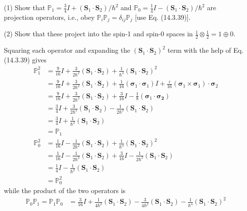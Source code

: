 \documentclass[../principles-of-quantum-mechanics.tex]{subfiles}
\begin{document}
\begin{questions}
		\question (1) Show that $\mathbb{P}_1 = \tfrac{3}{4}I + (\mathbf{S}_1\cdot\mathbf{S}_2)/\hbar^2$ and $\mathbb{P}_0 = \tfrac{1}{4}I - (\mathbf{S}_1\cdot\mathbf{S}_2)/\hbar^2$ are projection operators, i.e., obey $\mathbb{P}_i\mathbb{P}_j = \delta_{ij}\mathbb{P}_j$ [use Eq. (14.3.39)].
		
		(2) Show that these project into the spin-1 and spin-0 spaces in $\tfrac{1}{2}\otimes\tfrac{1}{2}=1\oplus0$.
		
		\begin{solution}
			Squaring each operator and expanding the $(\mathbf{S}_1\cdot\mathbf{S}_2)^2$ term with the help of Eq. (14.3.39) gives
			\begin{align*}
				\mathbb{P}_1^2 &= \frac{9}{16}I + \frac{3}{2\hbar^2}(\mathbf{S}_1\cdot\mathbf{S}_2) + \frac{1}{\hbar^4}(\mathbf{S}_1\cdot\mathbf{S}_2)^2 \\
				&= \frac{9}{16}I + \frac{3}{2\hbar^2}(\mathbf{S}_1\cdot\mathbf{S}_2) + \frac{1}{16}(\boldsymbol{\sigma}_1\cdot\boldsymbol{\sigma}_1) I + \frac{i}{16}(\boldsymbol{\sigma}_1\times\boldsymbol{\sigma}_1)\cdot\boldsymbol{\sigma}_2 \\
				&= \frac{9}{16}I + \frac{3}{2\hbar^2}(\mathbf{S}_1\cdot\mathbf{S}_2) + \frac{3}{16}I - \frac{1}{8}(\boldsymbol{\sigma}_1\cdot\boldsymbol{\sigma_2}) \\
				&= \frac{3}{4}I + \frac{3}{2\hbar^2}(\mathbf{S}_1\cdot\mathbf{S}_2) - \frac{1}{2\hbar^2}(\mathbf{S}_1\cdot\mathbf{S}_2) \\
				&= \frac{3}{4}I + \frac{1}{\hbar^2}(\mathbf{S}_1\cdot\mathbf{S}_2) \\
				&= \mathbb{P}_1 \\
				\mathbb{P}_0^2 &= \frac{1}{16}I - \frac{1}{2\hbar^2}(\mathbf{S}_1\cdot\mathbf{S}_2) + \frac{1}{\hbar^4}(\mathbf{S}_1\cdot\mathbf{S}_2)^2 \\
				&= \frac{1}{16}I - \frac{1}{2\hbar^2}(\mathbf{S}_1\cdot\mathbf{S}_2) + \frac{3}{16}I - \frac{1}{2\hbar^2}(\mathbf{S}_1\cdot\mathbf{S}_2) \\
				&= \frac{1}{4}I - \frac{1}{\hbar^2}(\mathbf{S}_1\cdot\mathbf{S}_2) \\
				&= \mathbb{P}_0^2
			\end{align*}
			while the product of the two operators is
			\begin{align*}
				\mathbb{P}_0\mathbb{P}_1 = \mathbb{P}_1\mathbb{P}_0 &= \frac{3}{16}I + \frac{1}{4\hbar^2}(\mathbf{S}_1\cdot\mathbf{S}_2) - \frac{3}{4\hbar^2}(\mathbf{S}_1\cdot\mathbf{S}_2) - \frac{1}{\hbar^4}(\mathbf{S}_1\cdot\mathbf{S}_2)^2 \\

\end{align*}
\end{solution}
\end{questions}
\end{document}
